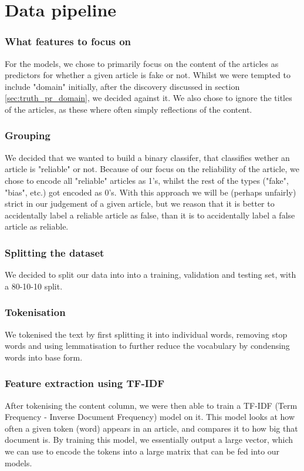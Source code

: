 \section*{Data pipeline}
\subsubsection{What features to focus on}
For the models, we chose to primarily focus on the content of the articles as predictors for whether a given article is
fake or not. Whilst we were tempted to include "domain" initially, after the discovery discussed in section \ref{sec:truth_pr_domain},
we decided against it. We also chose to ignore the titles of the articles, as these where often simply reflections of the
content.

\subsubsection{Grouping}
We decided that we wanted to build a binary classifer, that classifies wether an article is "reliable" or not. Because of our focus on the reliability of
the article, we chose to encode all "reliable" articles as 1's, whilst the rest of the types ("fake", "bias", etc.) got
encoded as 0's. With this approach we will be (perhaps unfairly) strict in our judgement of a given article, but we
reason that it is better to accidentally label a reliable article as false, than it is to accidentally label a false
article as reliable.

\subsubsection{Splitting the dataset}
We decided to split our data into into a training, validation and testing set, with a 80-10-10 split.

\subsubsection{Tokenisation}
We tokenised the text by first splitting it into
individual words, removing stop words and using lemmatisation to further reduce the vocabulary by condensing words into
base form.

\subsubsection{Feature extraction using TF-IDF}
After tokenising the content column, we were then able to train a TF-IDF (Term Frequency - Inverse Document Frequency)
model on it. This model looks at how often a given token (word) appears in an article, and compares it to how big that
document is. By training this model, we essentially output a large vector, which we can use to encode the tokens into a
large matrix that can be fed into our models.

